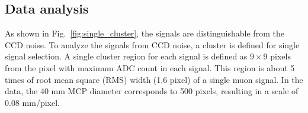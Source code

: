 \documentclass[preprint,3p,twocolumn]{elsarticle}
\begin{document}

\subsection{Data analysis}

As shown in Fig.~\ref{fig:single_cluster}, the %
signals are distinguishable from the CCD noise. %
%
To analyze the signals from
CCD noise, a cluster is defined for single signal selection. A
single cluster region for each signal is defined as $9 \times 9$
pixels from the pixel with maximum ADC count in each signal. This
region is about 5 times of root mean square (RMS) width (1.6
pixel) of a single muon signal. 
In the data, the 40 mm MCP diameter corresponds to 500 pixels, resulting in a scale of 0.08 mm/pixel.
%
\end{document}
